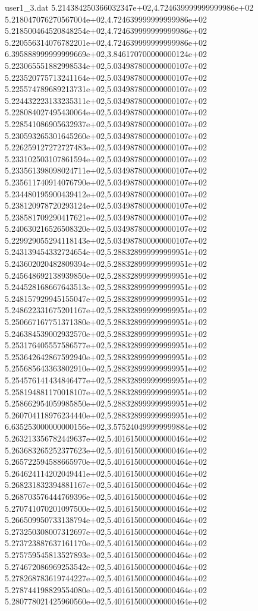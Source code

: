 \begin{filecontents}{user1_3.dat}
5.214384250366032347e+02,4.724639999999999986e+02
5.218047076270567004e+02,4.724639999999999986e+02
5.218500464520848254e+02,4.724639999999999986e+02
5.220556314076782201e+02,4.724639999999999986e+02
6.395888999999999669e+02,3.846170700000000124e+02
5.223065551882998534e+02,5.034987800000000107e+02
5.223520775713241164e+02,5.034987800000000107e+02
5.225574789689213731e+02,5.034987800000000107e+02
5.224432223133235311e+02,5.034987800000000107e+02
5.228084027495430064e+02,5.034987800000000107e+02
5.228541086905632937e+02,5.034987800000000107e+02
5.230593265301645260e+02,5.034987800000000107e+02
5.226259127272727483e+02,5.034987800000000107e+02
5.233102503107861594e+02,5.034987800000000107e+02
5.233561398098024711e+02,5.034987800000000107e+02
5.235611740914076790e+02,5.034987800000000107e+02
5.234480195900439412e+02,5.034987800000000107e+02
5.238120978720293124e+02,5.034987800000000107e+02
5.238581709290417621e+02,5.034987800000000107e+02
5.240630216526508320e+02,5.034987800000000107e+02
5.229929055294118143e+02,5.034987800000000107e+02
5.243139454332724654e+02,5.288328999999999951e+02
5.243602020482809394e+02,5.288328999999999951e+02
5.245648692138939850e+02,5.288328999999999951e+02
5.244528168667643513e+02,5.288328999999999951e+02
5.248157929945155047e+02,5.288328999999999951e+02
5.248622331675201167e+02,5.288328999999999951e+02
5.250667167751371380e+02,5.288328999999999951e+02
5.246384539002932570e+02,5.288328999999999951e+02
5.253176405557586577e+02,5.288328999999999951e+02
5.253642642867592940e+02,5.288328999999999951e+02
5.255685643363802910e+02,5.288328999999999951e+02
5.254576141434846477e+02,5.288328999999999951e+02
5.258194881170018107e+02,5.288328999999999951e+02
5.258662954059985850e+02,5.288328999999999951e+02
5.260704118976234440e+02,5.288328999999999951e+02
6.635253000000000156e+02,3.575240499999999884e+02
5.263213356782449637e+02,5.401615000000000464e+02
5.263683265252377623e+02,5.401615000000000464e+02
5.265722594588665970e+02,5.401615000000000464e+02
5.264624114202049441e+02,5.401615000000000464e+02
5.268231832394881167e+02,5.401615000000000464e+02
5.268703576444769396e+02,5.401615000000000464e+02
5.270741070201097500e+02,5.401615000000000464e+02
5.266509950733138794e+02,5.401615000000000464e+02
5.273250308007312697e+02,5.401615000000000464e+02
5.273723887637161170e+02,5.401615000000000464e+02
5.275759545813527893e+02,5.401615000000000464e+02
5.274672086969253542e+02,5.401615000000000464e+02
5.278268783619744227e+02,5.401615000000000464e+02
5.278744198829554080e+02,5.401615000000000464e+02
5.280778021425960560e+02,5.401615000000000464e+02

\end{filecontents}
